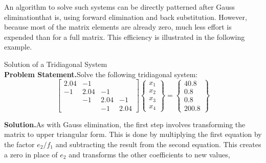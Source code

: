 \documentclass[../main.tex]{subfiles}
\begin{document}
An algorithm to solve such systems can be directly patterned after Gauss eliminationthat is, using forward elimination and back substitution. However, because most of the matrix elements are already zero, much less effort is expended than for a full matrix. This efficiency is illustrated in the following example.

\begin{example} Solution of a Tridiagonal System\\

    \noindent\textbf{Problem Statement.}\quad Solve the following tridiagonal system:\\

    $$
    \left[\begin{array}{cccc}
    2.04 & -1 & & \\
    -1 & 2.04 & -1 & \\
    & -1 & 2.04 & -1 \\
    & & -1 & 2.04
    \end{array}\right]\left\{\begin{array}{l}
    x_{1} \\
    x_{2} \\
    x_{3} \\
    x_{4}
    \end{array}\right\}=\left\{\begin{array}{c}
    40.8 \\
    0.8 \\
    0.8 \\
    200.8
    \end{array}\right\}
    $$
    
    \noindent\textbf{Solution.}\quad As with Gauss elimination, the first step involves transforming the matrix to upper triangular form. This is done by multiplying the first equation by the factor $e_{2} / f_{1}$ and subtracting the result from the second equation. This creates a zero in place of $e_{2}$ and transforms the other coefficients to new values,\\


\end{example}
\end{document}
